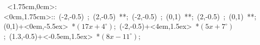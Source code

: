 \hbox{
\xy    <1.75cm,0cm>:<0cm,1.75cm>::
       (-2,-0.5) ; (2,-0.5) **\dir{-};  
       (-2,-0.5) ; (0,1) **\dir{-}; 
       (2,-0.5) ; (0,1) **\dir{-};
       (0,1)+<0em,-5.5ex> *{\hbox{$(17x+4^{\circ})$}};
       (-2,-0.5)+<4em,1.5ex> *{\hbox{$(5x+7^{\circ})$}};
       (1.3,-0.5)+<-0.5em,1.5ex> *{\hbox{$(8x-11^{\circ})$}};
       \endxy}
